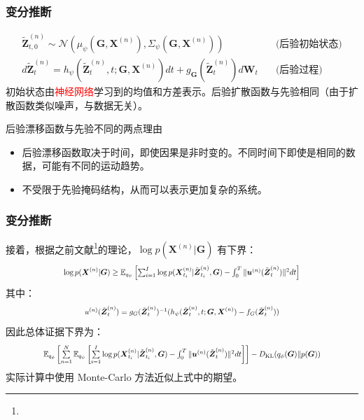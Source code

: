 \documentclass{beamer}
\begin{document}
\begin{frame}
\frametitle{变分推断}
\begin{equation*}
\begin{aligned}
\tilde{\boldsymbol Z}_{t,0}^{(n)}\sim\mathcal{N}(\mu_{\psi}(\boldsymbol G,\boldsymbol X^{(n)}),\Sigma_{\psi}(\boldsymbol G,\boldsymbol X^{(n)}))\quad&\text{(后验初始状态)}\\d\tilde{\boldsymbol Z}_{t}^{(n)}=h_{\psi}(\tilde{\boldsymbol Z}_{t}^{(n)},t;\boldsymbol G,\boldsymbol X^{(n)})dt+g_{\boldsymbol G}(\tilde{\boldsymbol Z}_{t}^{(n)})d\boldsymbol W_{t}\quad&\text{(后验过程)}
\end{aligned}
\end{equation*}
初始状态由\textcolor{red}{神经网络}学习到的均值和方差表示。后验扩散函数与先验相同（由于扩散函数类似噪声，与数据无关）。
\begin{block}{后验漂移函数与先验不同的两点理由}
    \begin{itemize}
        \item 后验漂移函数取决于时间，即使因果是非时变的。不同时间下即使是相同的数据，可能有不同的运动趋势。
        \item 不受限于先验掩码结构，从而可以表示更加复杂的系统。
    \end{itemize}
\end{block}
\end{frame}
\begin{frame}
\frametitle{变分推断}
接着，根据之前文献\footnote[frame]{}的理论，$\log p(\boldsymbol{X}^{(n)}|\boldsymbol{G})$ 有下界：
\begin{equation}\scalebox{0.78}{$
    \log p(\boldsymbol{X}^{(n)}|\boldsymbol{G})\geq\mathbb{E}_{q_\psi}\left[\sum_{i=1}^I\log p(\boldsymbol{X}_{t_i}^{(n)}|\tilde{\boldsymbol{Z}}_{t_i}^{(n)},\boldsymbol{G})-\int_0^T\|\boldsymbol{u}^{(n)}(\tilde{\boldsymbol{Z}}_t^{(n)})\|^2dt\right]$}
\end{equation}
其中：
\begin{equation}\scalebox{0.78}{$
    u^{(n)}(\tilde{\boldsymbol Z}_t^{(n)})=g_G(\tilde{\boldsymbol Z}_t^{(n)})^{-1}(h_\psi(\tilde{\boldsymbol Z}_t^{(n)},t;\boldsymbol G,\boldsymbol X^{(n)})-f_G(\tilde{\boldsymbol Z}_t^{(n)}))$}
\end{equation}
因此总体证据下界为：
\begin{equation}
    \scalebox{0.78}{$\mathbb{E}_{q_{\phi}}\left[\sum\limits_{n=1}^{N}\mathbb{E}_{q_{\psi}}\left[\sum\limits_{i=1}^{I}\log p(\boldsymbol X_{t_{i}}^{(n)}|\tilde{\boldsymbol Z}_{t_{i}}^{(n)},\boldsymbol G)-\int_{0}^{T}\|\boldsymbol u^{(n)}(\tilde{\boldsymbol Z}_{t}^{(n)})\|^{2}dt\right]\right]-D_{\mathrm{KL}}(q_{\phi}(\boldsymbol{G})\|p(\boldsymbol{G}))$}
\end{equation}
实际计算中使用 Monte-Carlo 方法近似上式中的期望。
\end{frame}
\end{document}

